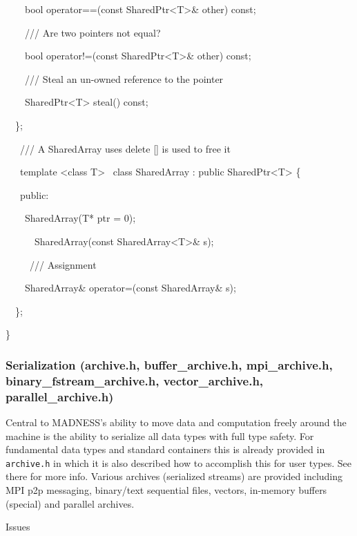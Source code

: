 \documentclass[letterpaper]{article}
\begin{document}
{\ttfamily
\ \ \ \ bool operator==(const SharedPtr{\textless}T{\textgreater}\& other) const;}

{\ttfamily
\ \ \ \ /// Are two pointers not equal?}

{\ttfamily
\ \ \ \ bool operator!=(const SharedPtr{\textless}T{\textgreater}\& other) const;}

{\ttfamily
\ \ \ \ /// Steal an un-owned reference to the pointer }

{\ttfamily
\ \ \ \ SharedPtr{\textless}T{\textgreater} steal() const;}

{\ttfamily
\ \ \};}

{\ttfamily
\ \ \ /// A SharedArray uses delete [] is used to free it}

{\ttfamily
\ \ \ template {\textless}class T{\textgreater} \ class SharedArray : public SharedPtr{\textless}T{\textgreater} \{}

{\ttfamily
\ \ \ public:}

{\ttfamily
\ \ \ \ SharedArray(T* ptr = 0);}

{\ttfamily
\ \ \ \ \ \ SharedArray(const SharedArray{\textless}T{\textgreater}\& s);}

{\ttfamily
\ \ \ \ \ /// Assignment}

{\ttfamily
\ \ \ \ SharedArray\& operator=(const SharedArray\& s);}

{\ttfamily
\ \ \};}

{\ttfamily
\}}

\subsubsection{Serialization (archive.h, buffer\_archive.h, mpi\_archive.h, binary\_fstream\_archive.h, vector\_archive.h, parallel\_archive.h)}
Central to MADNESS's ability to move data and computation freely around the machine is the ability to serialize all data
types with full type safety. For fundamental data types and standard containers this is already provided in
\texttt{archive.h} in which it is also described how to accomplish this for user types. See there for more info.
Various archives (serialized streams) are provided including MPI p2p messaging, binary/text sequential files, vectors,
in-memory buffers (special) and parallel archives.

Issues
\end{document}
